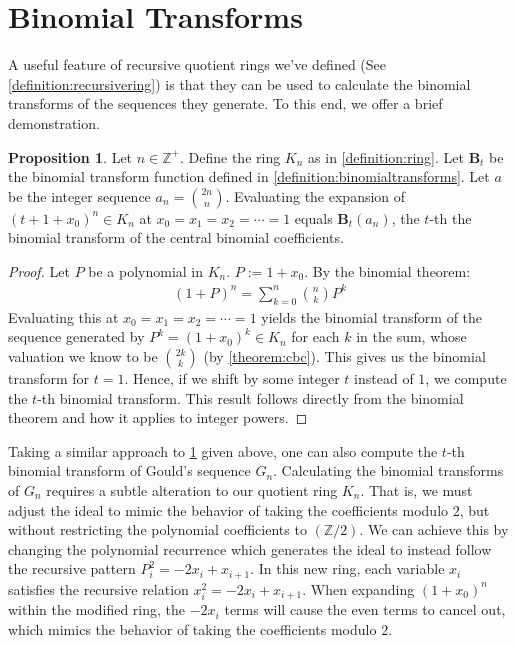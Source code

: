 \documentclass{article}
\theoremstyle{plain}
\theoremstyle{definition}
\newtheorem{proposition}{Proposition}
\newcommand{\Z}{\mathbb{Z}}
\newcommand{\K}{K}
\newcommand{\BT}{\textbf{B}}
\begin{document}
\section{Binomial Transforms}
A useful feature of recursive quotient rings we've defined (See \cref{definition:recursivering}) is that they can be used to calculate the binomial transforms of the sequences they generate. To this end, we offer a brief demonstration.

\begin{proposition} \label{proposition:binomialtransforms}
Let $n \in \Z^+$. Define the ring $\K_n$ as in \cref{definition:ring}. Let $\BT_t$ be the binomial transform function defined in \cref{definition:binomialtransforms}. Let $a$ be the integer sequence $a_n=\binom{2n}{n}$. Evaluating the expansion of $(t + 1 + x_0)^n \in \K_n$ at $x_0=x_1=x_2=\cdots=1$ equals $\BT_t(a_n)$, the $t$-th the binomial transform of the central binomial coefficients.
\end{proposition}
\begin{proof}
Let $P$ be a polynomial in $\K_n$. $P := 1 + x_0$. By the binomial theorem:
\begin{align*}
    (1 + P)^n = \sum_{k=0}^{n} \binom{n}{k} P^k
\end{align*}
Evaluating this at $x_0=x_1=x_2=\cdots=1$ yields the binomial transform of the sequence generated by $P^k = (1 + x_0)^k \in \K_n$ for each $k$ in the sum, whose valuation we know to be $\binom{2k}{k}$ (by \cref{theorem:cbc}). This gives us the binomial transform for $t=1$. Hence, if we shift by some integer $t$ instead of $1$, we compute the $t$-th binomial transform. This result follows directly from the binomial theorem and how it applies to integer powers.
\end{proof}

Taking a similar approach to \cref{proposition:binomialtransforms} given above, one can also compute the $t$-th binomial transform of Gould's sequence $G_n$. Calculating the binomial transforms of $G_n$ requires a subtle alteration to our quotient ring $K_n$. That is, we must adjust the ideal to mimic the behavior of taking the coefficients modulo $2$, but without restricting the polynomial coefficients to $(\Z/2)$. We can achieve this by changing the polynomial recurrence which generates the ideal to instead follow the recursive pattern $P_{i}^2 = -2 x_i + x_{i+1}$. In this new ring, each variable $x_i$ satisfies the recursive relation $x_i^2 = -2x_i + x_{i+1}$. When expanding $(1+x_0)^n$ within the modified ring, the $-2x_i$ terms will cause the even terms to cancel out, which mimics the behavior of taking the coefficients modulo $2$.

\begingroup
\raggedright


\endgroup
\end{document}
